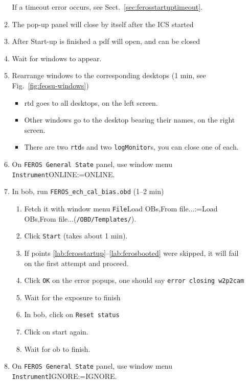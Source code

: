 \documentclass[11pt,fleqn]{book} %
\makeatletter
\def\menu#1#2{\texttt{#1}\ifx{}#2\else\@for\@x:=#2\do{$\rightarrow$\texttt{\@x}}\fi}
\def\wmenu#1#2{window menu \menu{#1}{#2}}
\def\fetchob{\wmenu{File}{Load OBs,From file...}}
\makeatother
\begin{document}
\begin{enumerate}
\begin{enumerate}
               If a timeout error occurs, see Sect.~\ref{sec:ferosstartuptimeout}.     
         \item The pop-up panel will close by itself after the ICS started    
         \item After Start-up is finished a pdf will open, and can be closed     
         \item Wait for windows to appear.
         \item \label{lab:ferosbooted} Rearrange windows to the corresponding desktops (1 min, see Fig.~\ref{fig:feosu-windows})
           \begin{itemize}
              \item \gls{rtd} goes to all desktops, on the left screen.
              \item Other windows go to the desktop bearing their names, on the right screen.
              \item There are two \texttt{rtd}s and two \texttt{logMonitor}s, you can close one of each.
           \end{itemize}
         \item\label{lab:ferosonline} On \texttt{FEROS General State} panel, use \wmenu{Instrument}{ONLINE}.
         \item In \gls{bob}, run \texttt{FEROS\_ech\_cal\_bias.obd} (1--2 min)
           \begin{enumerate}
             \item Fetch it with \fetchob (\texttt{/OBD/Templates/}).
             \item Click \texttt{Start} (takes about 1 min).
             \item If points \ref{lab:ferosstartup}--\ref{lab:ferosbooted} were skipped, it will fail on the first attempt and proceed.
            \item Click \texttt{OK} on the error popups, one should say \texttt{error closing w2p2cam}
            \item Wait for the exposure to finish
            \item In \gls{bob}, click on \texttt{Reset status}
            \item Click on start again.
            \item Wait for \gls{ob} to finish.
           \end{enumerate}
          \item On \texttt{FEROS General State} panel, use \wmenu{Instrument}{IGNORE}.
        \end{enumerate}

\end{enumerate}
\end{document}
